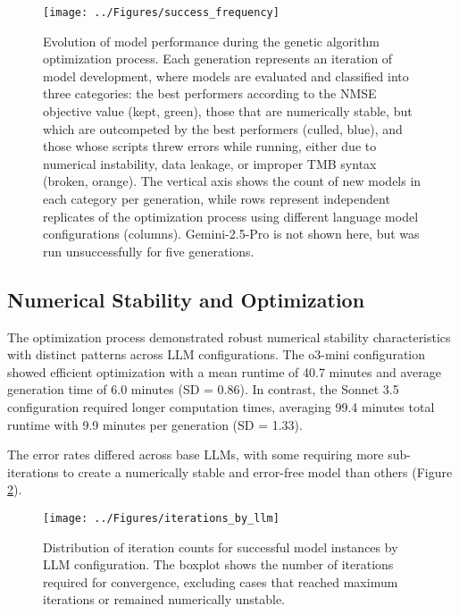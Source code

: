 \begin{figure}[H]
\centering
\texttt{[image: ../Figures/success\_frequency]}
\caption{Evolution of model performance during the genetic algorithm optimization process. Each generation represents an iteration of model development, where models are evaluated and classified into three categories: the best performers according to the NMSE objective value (kept, green), those that are numerically stable, but which are outcompeted by the best performers (culled, blue), and those whose scripts threw errors while running, either due to numerical instability, data leakage, or improper TMB syntax (broken, orange). The vertical axis shows the count of new models in each category per generation, while rows represent independent replicates of the optimization process using different language model configurations (columns). Gemini-2.5-Pro is not shown here, but was run unsuccessfully for five generations.}
\label{fig:status_distribution}
\end{figure}
  

\subsection{Numerical Stability and Optimization}

The optimization process demonstrated robust numerical stability characteristics with distinct patterns across LLM configurations. The o3-mini configuration showed efficient optimization with a mean runtime of 40.7 minutes and average generation time of 6.0 minutes (SD = 0.86). In contrast, the Sonnet 3.5 configuration required longer computation times, averaging 99.4 minutes total runtime with 9.9 minutes per generation (SD = 1.33).

The error rates differed across base LLMs, with some requiring more sub-iterations to create a numerically stable and error-free model than others (Figure \ref{fig:iterations_by_llm}). 

\begin{figure}[H]
\centering
\texttt{[image: ../Figures/iterations\_by\_llm]}
\caption{Distribution of iteration counts for successful model instances by LLM configuration. The boxplot shows the number of iterations required for convergence, excluding cases that reached maximum iterations or remained numerically unstable.}
\label{fig:iterations_by_llm}
\end{figure}




